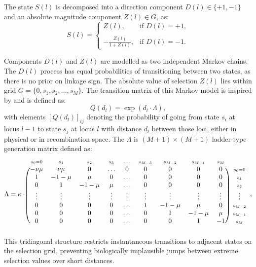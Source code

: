 \documentclass{article}
\newcommand{\matindex}[1]{{\scriptstyle#1}}%
\begin{document}
The state $S(l)$ is decomposed into a direction component $D(l) \in \{+1, -1\}$ and an absolute magnitude component $Z(l) \in G$, as:
$$
S(l) = \begin{cases}
Z(l), & \text{if } D(l) = +1, \\\\
-\frac{Z(l)}{1 + Z(l)}, & \text{if } D(l) = -1.
\end{cases}
$$

Components $D(l)$ and $Z(l)$ are modelled as two independent Markov chains.
The $D(l)$ process has equal probabilities of transitioning between two states, as there is no prior on linkage sign.
The absolute value of selection $Z(l)$ lies within grid $G = \{0, s_1, s_2, \dots, s_{M}\}$.
The transition matrix of this Markov model is inspired by \citet{galimberti2020} and is defined as:
$$Q(d_l) = \exp(d_l \cdot \Lambda),$$
with elements $[Q(d_l)]_{ij}$ denoting the probability of going from state $s_i$ at locus $l-1$ to state $s_j$ at locus $l$ with distance $d_l$ between those loci, either in physical or in recombination space.
The $\Lambda$ is $(M+1)\times(M+1)$ ladder-type generation matrix defined as:
$$
  \Lambda = \kappa \cdot \begin{blockarray}{cccccccccc}
  \matindex{s_0=0} & \matindex{s_1} & \matindex{s_2} & \matindex{s_3} & \ldots & \matindex{s_{M-3}} & \matindex{s_{M-2}} & \matindex{s_{M-1}} & \matindex{s_{M}} &\\
    \begin{block}{(ccccccccc)c}
      -\nu \mu & \nu \mu & 0 & \ldots & 0 & 0 & 0 & 0 & 0 & \matindex{s_0=0} \\
      1 & -1-\mu & \mu & 0 & \ldots & 0 & 0 & 0 & 0 & \matindex{s_1} \\
      0 & 1 & -1-\mu & \mu & \ldots & 0 & 0 & 0 & 0 & \matindex{s_2} \\
      \vdots & \vdots & \vdots & \vdots & \vdots & \vdots & \vdots & \vdots & \vdots & \vdots\\
      0 & 0 & 0 & 0 & \ldots & 1 & -1 - \mu & \mu & 0 & \matindex{s_{M-2}}\\
      0 & 0 & 0 & 0 & \ldots & 0 & 1 & -1 - \mu & \mu & \matindex{s_{M-1}}\\
      0 & 0 & 0 & 0 & \ldots & 0 & 0 & 1 & -1 & \matindex{s_{M}}\\
    \end{block}
  \end{blockarray},
$$
This tridiagonal structure restricts instantaneous transitions to adjacent states on the selection grid, preventing biologically implausible jumps between extreme selection values over short distances.
\end{document}
